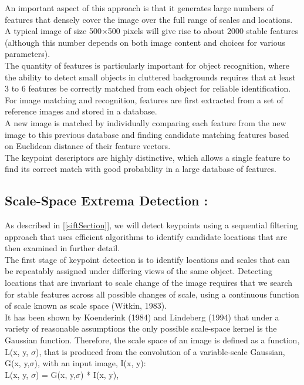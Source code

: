 An important aspect of this approach is that it generates large numbers of features that
densely cover the image over the full range of scales and locations.\\ A typical image of size
500$\times$500 pixels will give rise to about 2000 stable features (although this number depends
on both image content and choices for various parameters).\\ The quantity of features is
particularly important for object recognition, where the ability to detect small objects in
cluttered backgrounds requires that at least 3 to 6 features be correctly matched from each
object for reliable identiﬁcation.
For image matching and recognition, features are first extracted from a set of reference
images and stored in a database.\\ A new image is matched by individually comparing
each feature from the new image to this previous database and finding candidate matching
features based on Euclidean distance of their feature vectors.\\
The keypoint descriptors are highly distinctive, which allows a single feature to find its
correct match with good probability in a large database of features.
\subsection{Scale-Space Extrema Detection :}
As described in [\ref{siftSection}], we will detect keypoints using a sequential filtering approach
that uses efficient algorithms to identify candidate locations that are then examined
in further detail.\\ The first stage of keypoint detection is to identify locations and scales that
can be repeatably assigned under differing views of the same object. Detecting locations
that are invariant to scale change of the image requires that we search for stable features
across all possible changes of scale, using a continuous function of scale known as scale
space (Witkin, 1983).\\
It has been shown by Koenderink (1984) and Lindeberg (1994) that under a variety of reasonable assumptions the only possible scale-space kernel is the Gaussian function.
Therefore, the scale space of an image is defined as a function, L(x, y, $\sigma$), that is produced
from the convolution of a variable-scale Gaussian, G(x, y,$\sigma$), with an input image, I(x, y):\\

L(x, y, $\sigma$) = G(x, y,$\sigma$) * I(x, y),


